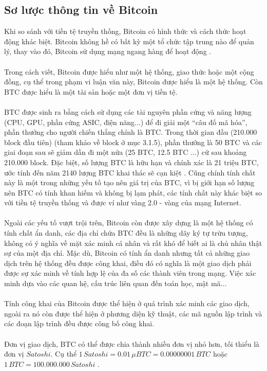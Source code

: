 \subsection{Sơ lược thông tin về Bitcoin}
Khi so sánh với tiền tệ truyền thống, Bitcoin có hình thức và cách thức hoạt 
động khác biệt. Bitcoin không hề có bất kỳ một tổ chức tập trung nào để quản 
lý, thay vào đó, Bitcoin sử dụng mạng ngang hàng để hoạt động \cite{Bitcoin1}.
\\\\
Trong cách viết, Bitcoin được hiểu như một hệ thống, giao thức hoặc một cộng 
đồng, cụ thể trong phạm vi luận văn này, Bitcoin được hiểu là một hệ thống. Còn 
BTC được hiểu là một tài sản hoặc một đơn vị tiền tệ.\\\\
BTC được sinh ra bằng cách sử dụng các tài nguyên phần cứng và năng lượng (CPU, 
GPU, phần cứng ASIC, điện năng...) để đi giải một ``câu đố mã hóa'', phần thưởng 
cho người chiến thắng chính là BTC. Trong thời gian đầu (210.000 block đầu tiên) 
(tham khảo về block ở mục 3.1.5), phần thưởng là 50 BTC và các giai đoạn sau sẽ giảm 
dần đi một nửa (25 BTC, 12.5 BTC ...) cứ sau khoảng 210.000 block. Đặc biệt, số 
lượng BTC là hữu hạn và chính xác là 21 triệu BTC, ước tính đến năm 2140 lượng 
BTC khai thác sẽ cạn kiệt \cite{Bitcoin2}. Cũng chính tính chất này là một trong 
những yếu tố tạo nên giá trị của BTC, vì bị giới hạn số lượng nên BTC có tính 
khan hiếm và không bị lạm phát, các tính chất này khác biệt so với tiền tệ 
truyền thống và được ví như vàng 2.0 - vàng của mạng Internet.\\\\
Ngoài các yếu tố vượt trội trên, Bitcoin còn được xây dựng là một hệ thống có 
tính chất ẩn danh, các địa chỉ chứa BTC đều là những dãy ký tự trừu tượng, không 
có ý nghĩa về mặt xác minh cá nhân và rất khó để biết ai là chủ nhân thật sự của 
một địa chỉ. Mặc dù, Bitcoin có tính ẩn danh nhưng tất cả những giao dịch trên 
hệ thống đều được công khai, điều đó có nghĩa là một giao dịch phải được sự xác 
minh về tính hợp lệ của đa số các thành viên trong mạng. Việc xác minh dựa vào các 
quan hệ, cấu trúc liên quan đến toán học, mật mã... \cite{Bitcoin1, BitcoinPaper}\\\\
Tính công khai của Bitcoin được thể hiện ở quá trình xác minh các giao dịch, 
ngoài ra nó còn được thể hiện ở phương diện kỹ thuật, các mã nguồn lập trình 
và các đoạn lập trình đều được công bố công khai.\\\\
Đơn vị giao dịch, BTC có thể được chia thành nhiều đơn vị nhỏ hơn, tối thiểu 
là đơn vị $Satoshi$. Cụ thể $1 \, Satoshi = 0.01 \, \mu BTC = 0.00000001 \, BTC$ 
hoặc $1 \, BTC = 100.000.000 \, Satoshi$ \cite{Bitcoin3}.
